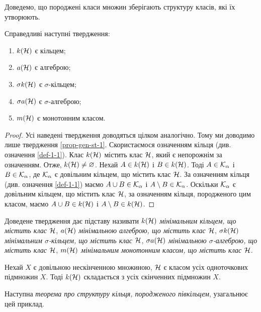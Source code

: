 Доведемо, що породжені класи множин зберігають структуру класів, які їх утворюють.
\begin{statement}
\label{prop-gen-str}
Справедливі наступні твердження:
\begin{enumerate}
\item \label{prop-gen-st-1}
$k(\mathcal H)$ є кільцем;
\item \label{prop-gen-str-2}
$a(\mathcal H)$ є алгеброю;
\item \label{prop-gen-str-3}
$\sigma k(\mathcal H)$ є $\sigma$-кільцем;
\item \label{prop-gen-str-4}
$\sigma a(\mathcal H)$ є $\sigma$-алгеброю;
\item \label{prop-gen-str-5}
$m(\mathcal H)$ є монотонним класом.
\end{enumerate}
\end{statement}

\begin{proof}
Усі наведені твердження доводяться цілком аналогічно. Тому ми доводимо лише твердження  \ref{prop-gen-st-1}. Скористаємося означенням кільця (див. означення \ref{def-1-1}).  Клас  $k(\mathcal H)$ містить  клас $\mathcal H$, який є непорожнім за означенням. Отже, $k(\mathcal H)\neq\varnothing$.  Нехай $A\in k(\mathcal H)$ і $B\in k(\mathcal H)$. Тоді  $A\in\mathcal K_\alpha$ і $B\in\mathcal K_\alpha$, де $\mathcal K_\alpha$ є довільним кільцем, що містить клас $\mathcal H$. За означенням кільця (див. означення \ref{def-1-1}) маємо $A\cup B\in\mathcal K_\alpha$ і $A\setminus B\in\mathcal K_\alpha$. Оскільки $\mathcal K_\alpha$ є довільним кільцем, що містить клас $\mathcal H$, за означенням кільця, породженого цим класом, маємо $A\cup B\in k(\mathcal H)$ і $A\setminus B\in k(\mathcal H)$.
\end{proof}

Доведене твердження дає підставу називати $k(\mathcal H)$ \emph{мінімальним кільцем, що містить клас $\mathcal H$}, $a(\mathcal H)$ \emph{мінімальною алгеброю, що містить клас $\mathcal H$}, $\sigma k(\mathcal H)$ \emph{мінімальним $\sigma$-кільцем, що містить клас $\mathcal H$}, $\sigma a(\mathcal H)$ \emph{мінімальною $\sigma$-алгеброю, що містить клас $\mathcal H$}, $m(\mathcal H)$ \emph{мінімальним монотонним класом, що містить клас $\mathcal H$}.

\begin{example}
	\label{ex-1-9}
	Нехай $X$ є довільною нескінченною множиною, $\mathcal H$ є класом усіх одноточкових підмножин $X$. Тоді $k(\mathcal H)$ складається з усіх скінченних підмножин $X$.
\end{example}

Наступна \emph{теорема про структуру кільця, породженого півкільцем}, узагальнює цей приклад.

